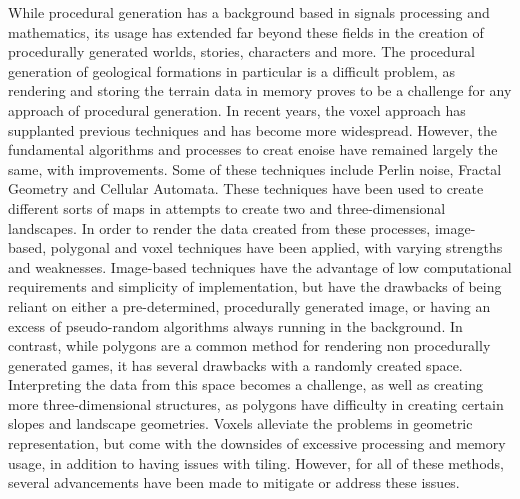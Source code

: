 \documentclass[10pt]{report}
\begin{document}
		While procedural generation has a background based in signals processing and mathematics, its usage has extended far beyond these fields in the creation of procedurally generated worlds, stories, characters and more. The procedural generation of geological formations in particular is a difficult problem, as rendering and storing the terrain data in memory proves to be a challenge for any approach of procedural generation. In recent years, the voxel approach has supplanted previous techniques and has become more widespread. However, the fundamental algorithms and processes to creat enoise have remained largely the same, with improvements. Some of these techniques include Perlin noise, Fractal Geometry and Cellular Automata. These techniques have been used to create different sorts of maps in attempts to create two and three-dimensional landscapes. In order to render the data created from these processes, image-based, polygonal and voxel techniques have been applied, with varying strengths and weaknesses. Image-based techniques have the advantage of low computational requirements and simplicity of implementation, but have the drawbacks of being reliant on either a pre-determined, procedurally generated image, or having an excess of pseudo-random algorithms always running in the background. In contrast, while polygons are a common method for rendering non procedurally generated games, it has several drawbacks with a randomly created space. Interpreting the data from this space becomes a challenge, as well as creating more three-dimensional structures, as polygons have difficulty in creating certain slopes and landscape geometries. Voxels alleviate the problems in geometric representation, but come with the downsides of excessive processing and memory usage, in addition to having issues with tiling. However, for all of these methods, several advancements have been made to mitigate or address these issues. 

		
	
	\newpage
	\renewcommand{\bibname}{References}
	
		
\end{document}
